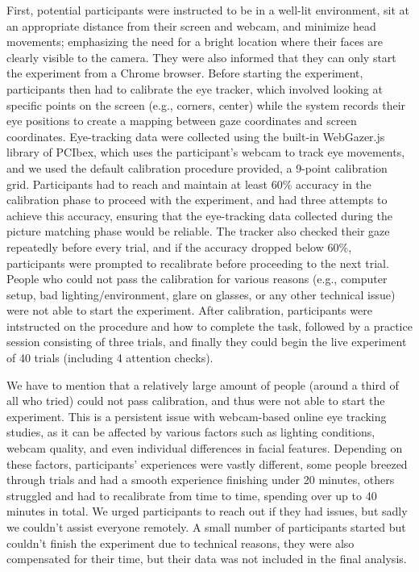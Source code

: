 \documentclass[a4paper, ruler]{CUP-JNL-LIN}%
\begin{document}
First, potential participants were instructed to be in a well-lit environment, sit at an appropriate distance from their screen and webcam, and minimize head movements; emphasizing the need for a bright location where their faces are clearly visible to the camera. They were also informed that they can only start the experiment from a Chrome browser. Before starting the experiment, participants then had to calibrate the eye tracker, which involved looking at specific points on the screen (e.g., corners, center) while the system records their eye positions to create a mapping between gaze coordinates and screen coordinates. Eye-tracking data were collected using the built-in WebGazer.js library of PCIbex, which uses the participant's webcam to track eye movements, and we used the default calibration procedure provided, a 9-point calibration grid. Participants had to reach and maintain at least 60\% accuracy in the calibration phase to proceed with the experiment, and had three attempts to achieve this accuracy, ensuring that the eye-tracking data collected during the picture matching phase would be reliable. The tracker also checked their gaze repeatedly before every trial, and if the accuracy dropped below 60\%, participants were prompted to recalibrate before proceeding to the next trial. People who could not pass the calibration for various reasons (e.g., computer setup, bad lighting/environment, glare on glasses, or any other technical issue) were not able to start the experiment. After calibration, participants were intstructed on the procedure and how to complete the task, followed by a practice session consisting of three trials, and finally they could begin the live experiment of 40 trials (including 4 attention checks).

We have to mention that a relatively large amount of people (around a third of all who tried) could not pass calibration, and thus were not able to start the experiment. This is a persistent issue with webcam-based online eye tracking studies, as it can be affected by various factors such as lighting conditions, webcam quality, and even individual differences in facial features. Depending on these factors, participants' experiences were vastly different, some people breezed through trials and had a smooth experience finishing under 20 minutes, others struggled and had to recalibrate from time to time, spending over up to 40 minutes in total. We urged participants to reach out if they had issues, but sadly we couldn't assist everyone remotely. A small number of participants started but couldn't finish the experiment due to technical reasons, they were also compensated for their time, but their data was not included in the final analysis.
\end{document}
